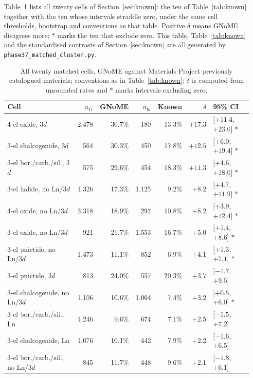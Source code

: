 \documentclass[11pt]{article}
\begin{document}
Table~\ref{tab:appallcells} lists all twenty cells of Section~\ref{sec:known}: the ten of
Table~\ref{tab:known} together with the ten whose intervals straddle zero, under the
same cell thresholds, bootstrap and conventions as that table. Positive $\delta$ means
GNoME disagrees more; $\ast$ marks the ten that exclude zero. This table,
Table~\ref{tab:known} and the standardised contrasts of Section~\ref{sec:known} are all
generated by \texttt{phase37\_matched\_cluster.py}.

\begin{table}[htbp]\centering
\caption{All twenty matched cells, GNoME against Materials Project previously catalogued materials; conventions as in Table~\ref{tab:known}; $\delta$ is computed from unrounded rates and $\ast$ marks intervals excluding zero.}\label{tab:appallcells}
\small\begin{tabular}{lrrrrrl}
\toprule
Cell & $n_{\text{G}}$ & GNoME & $n_{\text{K}}$ & Known & $\delta$ & 95\% CI \\
\midrule
4-el oxide, 3$d$ & 2{,}478 & 30.7\% & 180 & 13.3\% & $+17.3$ & [$+11.4$, $+23.0$] $\ast$ \\
3-el chalcogenide, 3$d$ & 564 & 30.3\% & 450 & 17.8\% & $+12.5$ & [$+6.0$, $+19.4$] $\ast$ \\
3-el bor./carb./sil., 3$d$ & 575 & 29.6\% & 454 & 18.3\% & $+11.3$ & [$+4.6$, $+18.0$] $\ast$ \\
3-el halide, no Ln/3$d$ & 1{,}326 & 17.3\% & 1{,}125 & 9.2\% & $+8.2$ & [$+4.7$, $+11.9$] $\ast$ \\
4-el oxide, no Ln/3$d$ & 3{,}318 & 18.9\% & 297 & 10.8\% & $+8.2$ & [$+3.9$, $+12.4$] $\ast$ \\
3-el oxide, no Ln/3$d$ & 921 & 21.7\% & 1{,}553 & 16.7\% & $+5.0$ & [$+1.4$, $+8.6$] $\ast$ \\
3-el pnictide, no Ln/3$d$ & 1{,}473 & 11.1\% & 852 & 6.9\% & $+4.1$ & [$+1.3$, $+7.1$] $\ast$ \\
3-el pnictide, 3$d$ & 813 & 24.0\% & 557 & 20.3\% & $+3.7$ & [$-1.7$, $+9.5$] \\
3-el chalcogenide, no Ln/3$d$ & 1{,}106 & 10.6\% & 1{,}064 & 7.4\% & $+3.2$ & [$+0.5$, $+6.0$] $\ast$ \\
3-el bor./carb./sil., Ln & 1{,}246 & 9.6\% & 674 & 7.1\% & $+2.5$ & [$-1.5$, $+7.2$] \\
3-el chalcogenide, Ln & 1{,}076 & 10.1\% & 442 & 7.9\% & $+2.2$ & [$-1.6$, $+6.5$] \\
3-el bor./carb./sil., no Ln/3$d$ & 845 & 11.7\% & 448 & 9.6\% & $+2.1$ & [$-1.8$, $+6.1$] \\

\end{tabular}
\end{table}
\end{document}
